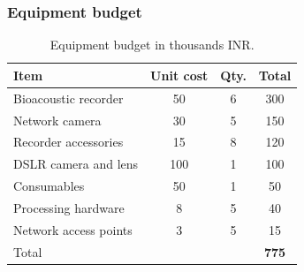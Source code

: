 \documentclass[mathserif]{beamer}
\begin{document}
\begin{frame}
\frametitle{Equipment budget}

\begin{table}[th]
\centering
\caption{Equipment budget in thousands INR.}
\begin{tabular}{|l|c|c|c|}
\hline
Item & Unit cost & Qty. & Total\\
\hline
Bioacoustic recorder & 50 & 6 & 300 \\
Network camera & 30 & 5 & 150  \\
Recorder accessories & 15 & 8 & 120 \\
DSLR camera and lens & 100 & 1 & 100\\
Consumables & 50 & 1 & 50\\
Processing hardware & 8 & 5 & 40 \\
Network access points & 3 & 5 & 15\\
\hline
Total &  & & \textbf{775} \\
\hline
\end{tabular}
\label{tab:equipFunding}
\end{table}
\end{frame}
\end{document}
